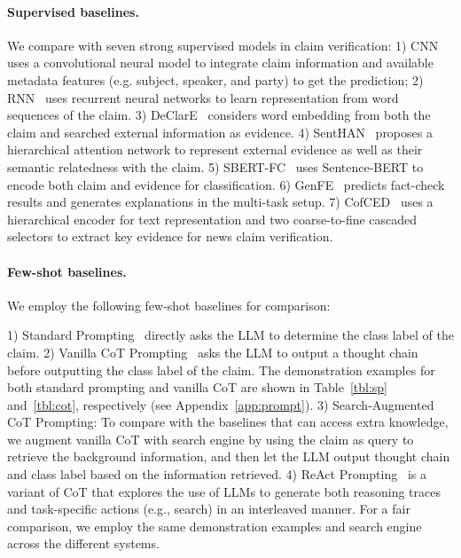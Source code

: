 \documentclass[11pt]{article}
\begin{document}
\paragraph{Supervised baselines.} We compare with seven strong supervised models in claim verification: 1) CNN~\cite{wang2017liar} uses a convolutional neural model to integrate claim information and available metadata features (e.g. subject, speaker, and party) to get the prediction; 
2) RNN~\cite{rashkin2017truth} uses recurrent neural networks to learn representation from word sequences of the claim.
3) DeClarE~\cite{popat2018declare} considers word embedding from both the claim and searched external information as evidence. 
4) SentHAN~\cite{ma2019sentence} proposes a hierarchical attention network to represent external evidence as well as their semantic relatedness with the claim. 
5) SBERT-FC~\cite{kotonya2020explainable} uses Sentence-BERT to encode both claim and evidence for classification. 
6) GenFE~\cite{atanasova2020generating} predicts fact-check results and generates explanations in the multi-task setup. 
7) CofCED~\cite{yang2022coarse} uses a hierarchical encoder for text representation and two coarse-to-fine cascaded selectors to extract key evidence for news claim verification.  


\paragraph{Few-shot baselines.} We employ the following few-shot baselines for comparison: 

1) Standard Prompting~\cite{brown2020language} directly asks the LLM to determine the class label of the claim. 
2) Vanilla CoT Prompting~\cite{wei2022chain} asks the LLM to output a thought chain before outputting the class label of the claim. The demonstration examples for both standard prompting and vanilla CoT are shown in Table~\ref{tbl:sp} and~\ref{tbl:cot}, respectively (see Appendix~\ref{app:prompt}). 3) Search-Augmented CoT Prompting: To compare with the baselines that can access extra knowledge, we augment vanilla CoT with search engine by using the claim as query to retrieve the background information, and then let the LLM output thought chain and class label based on the information retrieved.
4) ReAct Prompting~\cite{yao2023react} is a variant of CoT that 
explores the use of LLMs to generate both reasoning traces and task-specific actions (e.g., search) in an interleaved manner.
For a fair comparison, we employ the same demonstration examples and search engine across the different systems.
\end{document}
